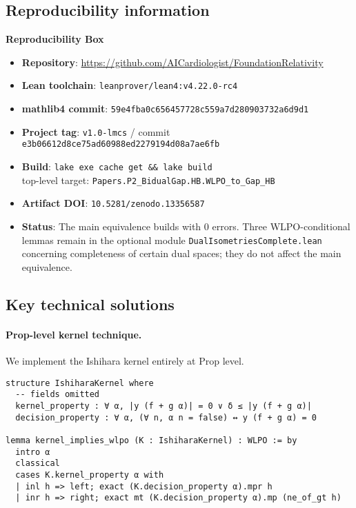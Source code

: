 \documentclass[11pt]{article}  %
\newcommand{\leanRepo}{\url{https://github.com/AICardiologist/FoundationRelativity}}
\begin{document}
\subsection{Reproducibility information}

\begin{mdframed}[backgroundcolor=gray!10]
\textbf{Reproducibility Box}
\begin{itemize}
\item \textbf{Repository}: \leanRepo
\item \textbf{Lean toolchain}: \texttt{leanprover/lean4:v4.22.0-rc4}
\item \textbf{mathlib4 commit}: \texttt{59e4fba0c656457728c559a7d280903732a6d9d1}
\item \textbf{Project tag}: \texttt{v1.0-lmcs} / commit \texttt{e3b06612d8ce75ad60988ed2279194d08a7ae6fb}
\item \textbf{Build}: \texttt{lake exe cache get \&\& lake build} \\
      top-level target: \texttt{Papers.P2\_BidualGap.HB.WLPO\_to\_Gap\_HB}
\item \textbf{Artifact DOI}: \texttt{10.5281/zenodo.13356587} %
\item \textbf{Status}: The main equivalence builds with 0 errors. Three WLPO-conditional lemmas remain in the optional module \texttt{DualIsometriesComplete.lean} concerning completeness of certain dual spaces; they do not affect the main equivalence.
\end{itemize}
\end{mdframed}

\subsection{Key technical solutions}

\paragraph{Prop-level kernel technique.}
We implement the Ishihara kernel entirely at Prop level.

\begin{lstlisting}[caption={Ishihara kernel (illustrative Lean snippet)}]
structure IshiharaKernel where
  -- fields omitted
  kernel_property : ∀ α, |y (f + g α)| = 0 ∨ δ ≤ |y (f + g α)|
  decision_property : ∀ α, (∀ n, α n = false) ↔ y (f + g α) = 0

lemma kernel_implies_wlpo (K : IshiharaKernel) : WLPO := by
  intro α
  classical
  cases K.kernel_property α with
  | inl h => left; exact (K.decision_property α).mpr h
  | inr h => right; exact mt (K.decision_property α).mp (ne_of_gt h)
\end{lstlisting}
\end{document}
